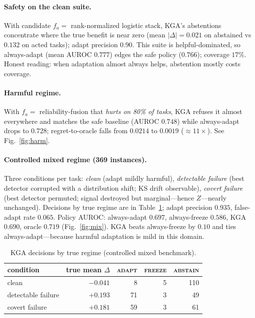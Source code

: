 \documentclass[11pt]{article}
\theoremstyle{plain}
\theoremstyle{definition}
\begin{document}
\paragraph{Safety on the clean suite.} With candidate $f_a=$ rank-normalized logistic
stack, \textsc{KGA}'s abstentions concentrate where the true benefit is near zero
(mean $|\Delta|=0.021$ on abstained vs $0.132$ on acted tasks); adapt precision $0.90$.
This suite is helpful-dominated, so always-adapt (mean AUROC $0.777$) edges the safe
policy ($0.766$); coverage $17\%$. Honest reading: when adaptation almost always helps,
abstention mostly costs coverage.

\paragraph{Harmful regime.} With $f_a=$ reliability-fusion that \emph{hurts on 80\% of
tasks}, \textsc{KGA} refuses it almost everywhere and matches the safe baseline
(AUROC $0.748$) while always-adapt drops to $0.728$; regret-to-oracle falls from
$0.0214$ to $0.0019$ ($\approx11\times$). See Fig.~\ref{fig:harm}.

\paragraph{Controlled mixed regime (369 instances).} Three conditions per task:
\emph{clean} (adapt mildly harmful), \emph{detectable failure} (best detector
corrupted with a distribution shift; KS drift observable), \emph{covert failure} (best
detector permuted; signal destroyed but marginal---hence $Z$---nearly unchanged).
Decisions by true regime are in Table~\ref{tab:mixed}; adapt precision $0.935$,
false-adapt rate $0.065$. Policy AUROC: always-adapt $0.697$, always-freeze $0.586$,
\textsc{KGA} $0.690$, oracle $0.719$ (Fig.~\ref{fig:mix}). \textsc{KGA} beats
always-freeze by $0.10$ and ties always-adapt---because harmful adaptation is mild in
this domain.

\begin{table}[h]\centering
\begin{tabular}{lrrrr}
\toprule
condition & true mean $\Delta$ & \textsc{adapt} & \textsc{freeze} & \textsc{abstain}\\
\midrule
clean & $-0.041$ & 8 & 5 & 110\\
detectable failure & $+0.193$ & 71 & 3 & 49\\
covert failure & $+0.181$ & 59 & 3 & 61\\
\bottomrule
\end{tabular}
\caption{\textsc{KGA} decisions by true regime (controlled mixed benchmark).}
\label{tab:mixed}
\end{table}
\end{document}
